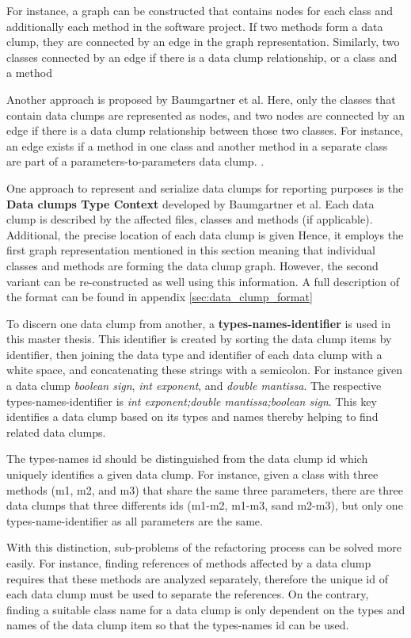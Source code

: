 For instance, a graph can be constructed that contains nodes for each class and additionally each method in the software project. If two methods form a data clump, they are connected by an edge in the graph representation. Similarly, two classes connected by an edge if there is a data clump relationship, or a class and a method   

Another approach is proposed by Baumgartner et al. Here, only the classes that contain data clumps are represented as nodes, and two nodes are connected by an edge if there is a data clump relationship between those two classes. For instance, an edge exists if a method in one class and another method in a separate class are part of a parameters-to-parameters data clump. \cite{data_clumps_baumgartner}.


One approach to represent and serialize data clumps for reporting purposes is the \textbf{Data clumps Type Context} \cite{dataclump_type_context} developed by Baumgartner et al. Each data clump is described by the affected files, classes and methods (if applicable). Additional, the precise location of each data clump is given Hence,  it employs the first graph representation mentioned in this section meaning that individual classes and methods are forming the data clump graph. However, the second variant can be re-constructed as well using this information. 
A full description of the format can be found in appendix \ref{sec:data_clump_format}

To discern one data clump from another, a \textbf{types-names-identifier} is used in this master thesis. This identifier is created by sorting the data clump items by identifier, then joining the data type and identifier of each data clump with a white space, and concatenating these strings with a semicolon. For instance given a data clump \textit{boolean sign}, \textit{int exponent}, and \textit{double mantissa}. The respective types-names-identifier is \textit{int exponent;double mantissa;boolean sign}. This key identifies a data clump based on its types and names thereby helping to find related data clumps. 

The types-names id should be distinguished from the data clump id which uniquely identifies a given data clump. For instance, given a class with three methods (m1, m2, and m3) that share the same three parameters, there are three data clumps that three differents ids (m1-m2, m1-m3, sand m2-m3), but only one types-name-identifier as all parameters are the same. 

With this distinction, sub-problems of the refactoring process can be solved more easily. For instance, finding references of methods affected by a data clump requires that these methods are analyzed separately, therefore the unique id of each data clump must be used to separate the references. On the contrary, finding a suitable class name for a data clump is only dependent on the types and names of the data clump item so that the types-names id can be used. 





